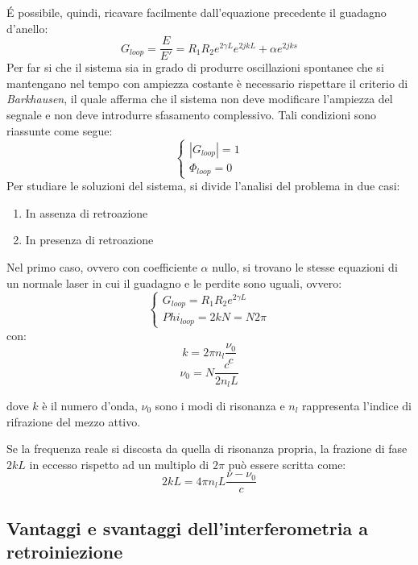 \'E possibile, quindi, ricavare facilmente dall'equazione precedente il guadagno d'anello:
\begin{equation}
	G_{loop}=\frac{E}{E'}=R_1R_2e^{2\gamma L}e^{2jkL}+\alpha e^{2jks}
\end{equation}
Per far si che il sistema sia in grado di produrre oscillazioni spontanee che si mantengano nel tempo con ampiezza costante è necessario rispettare il criterio di \textit{Barkhausen}, il quale afferma che il sistema non deve modificare l'ampiezza del segnale e non deve introdurre sfasamento complessivo. Tali condizioni sono riassunte come segue:
\begin{equation}
	\begin{cases}
   |G_{loop}|=1\\\Phi_{loop} = 0
   \end{cases}
\end{equation}
Per studiare le soluzioni del sistema, si divide l'analisi del problema in due casi:
\begin{enumerate}
	\item In assenza di retroazione 
	\item In presenza di retroazione
\end{enumerate}
Nel primo caso, ovvero con coefficiente $\alpha$ nullo, si trovano le stesse equazioni di un normale laser in cui il guadagno e le perdite sono uguali, ovvero:
\begin{equation}
	\begin{cases}
   G_{loop}=R_1R_2e^{2\gamma L}\\Phi_{loop} = 2kN=N2\pi
   \end{cases}
\end{equation}
con:
\begin{equation}
k=2\pi n_l \frac{\nu_0}{c}	
\end{equation}
\begin{equation}
	\nu_0 = N\frac{c}{2n_lL}
\end{equation}

dove $k$ è il numero d'onda, $\nu_0$ sono i modi di risonanza e $n_l$ rappresenta l'indice di rifrazione del mezzo attivo.

Se la frequenza reale si discosta da quella di risonanza propria, la frazione di fase $2kL$ in eccesso rispetto ad un multiplo di $2\pi$ può essere scritta come:
\begin{equation}
	2kL=4\pi n_l L \frac{\nu - \nu_0}{c}
\end{equation}

\subsection{Vantaggi e svantaggi dell'interferometria a retroiniezione}

